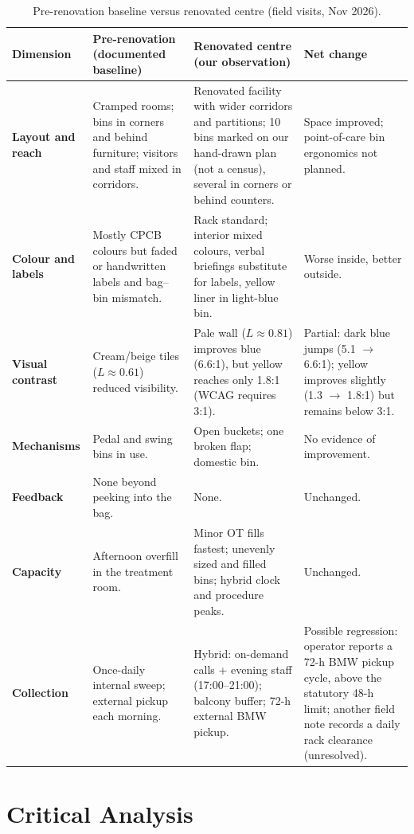 \documentclass[10pt,twocolumn,a4paper]{article}
\begin{document}
\begin{table}[!t]
\centering\footnotesize
\caption{Pre-renovation baseline \cite{g8report} versus renovated centre (field visits, Nov 2026).}\label{tab:compare}
\begin{tabularx}{\textwidth}{@{}>{\bfseries}p{2.6cm} Y Y Y@{}}
\toprule
Dimension & Pre-renovation (documented baseline) & Renovated centre (our observation) & Net change\\\midrule
Layout and reach & Cramped rooms; bins in corners and behind furniture; visitors and staff mixed in corridors. & Renovated facility with wider corridors and partitions; 10 bins marked on our hand-drawn plan (not a census), several in corners or behind counters. & Space improved; point-of-care bin ergonomics not planned.\\
Colour and labels & Mostly CPCB colours but faded or handwritten labels and bag--bin mismatch. & Rack standard; interior mixed colours, verbal briefings substitute for labels, yellow liner in light-blue bin. & Worse inside, better outside.\\
Visual contrast & Cream/beige tiles ($L \approx 0.61$) reduced visibility. & Pale wall ($L \approx 0.81$) improves blue (6.6:1), but yellow reaches only 1.8:1 (WCAG requires 3:1). & Partial: dark blue jumps (5.1 $\to$ 6.6:1); yellow improves slightly (1.3 $\to$ 1.8:1) but remains below 3:1.\\
Mechanisms & Pedal and swing bins in use. & Open buckets; one broken flap; domestic bin. & No evidence of improvement.\\
Feedback & None beyond peeking into the bag. & None. & Unchanged.\\
Capacity & Afternoon overfill in the treatment room. & Minor OT fills fastest; unevenly sized and filled bins; hybrid clock and procedure peaks. & Unchanged.\\
Collection & Once-daily internal sweep; external pickup each morning. & Hybrid: on-demand calls + evening staff (17:00--21:00); balcony buffer; 72-h external BMW pickup. & Possible regression: operator reports a 72-h BMW pickup cycle, above the statutory 48-h limit; another field note records a daily rack clearance (unresolved).\\
\bottomrule
\end{tabularx}
\end{table}

\section{Critical Analysis}
\end{document}
